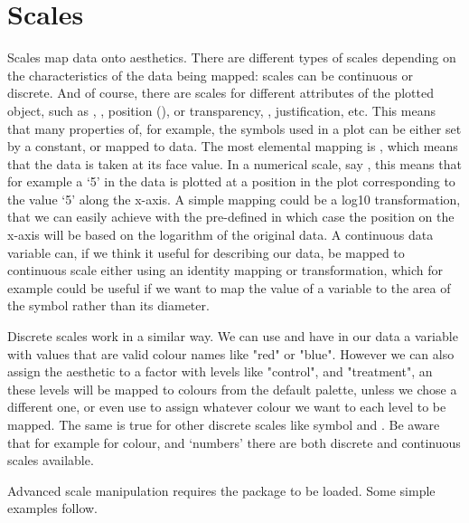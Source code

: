 \documentclass[paper=a4,10pt,div=17,headsepline,BCOR=12mm,twoside,open=right]{scrbook}\usepackage{knitr}
\begin{document}
\section{Scales}

Scales map data onto aesthetics. There are different types of scales depending on the characteristics of the data being mapped: scales can be continuous or discrete. And of course, there are scales for different attributes of the plotted object, such as , , position (),  or transparency, , justification, etc. This means that many properties of, for example, the symbols used in a plot can be either set by a constant, or mapped to data. The most elemental mapping is , which means that the data is taken at its face value. In a numerical scale, say , this means that for example a `5' in the data is plotted at a position in the plot corresponding to the value `5' along the x-axis. A simple mapping could be a log10 transformation, that we can easily achieve with the pre-defined  in which case the position on the x-axis will be based on the logarithm of the original data. A continuous data variable can, if we think it useful for describing our data, be mapped to continuous scale either using an identity mapping or transformation, which for example could be useful if we want to map the value of a variable to the area of the symbol rather than its diameter.

Discrete scales work in a similar way. We can use  and have in our data a variable with values that are valid colour names like "red" or "blue". However we can also assign the  aesthetic to a factor with levels like "control", and "treatment", an these levels will be mapped to colours from the default palette, unless we chose a different one, or even use  to assign whatever colour we want to each level to be mapped. The same is true for other discrete scales like symbol  and . Be aware that for example for colour, and `numbers' there are both discrete and continuous scales available.

Advanced scale manipulation requires the package  to be loaded. Some simple examples follow.
\end{document}
